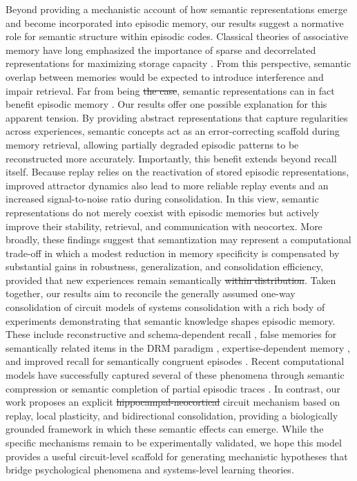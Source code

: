 \documentclass{article}
\providecommand{\DIFaddtex}[1]{{\protect\color{blue}\uwave{#1}}} %
\providecommand{\DIFdeltex}[1]{{\protect\color{red}\sout{#1}}}                      %
\providecommand{\DIFaddbegin}{} %
\providecommand{\DIFaddend}{} %
\providecommand{\DIFdelbegin}{} %
\providecommand{\DIFdelend}{} %
\providecommand{\DIFadd}[1]{\texorpdfstring{\DIFaddtex{#1}}{#1}} %
\providecommand{\DIFdel}[1]{\texorpdfstring{\DIFdeltex{#1}}{}} %
\begin{document}
\newline\newline
Beyond providing a mechanistic account of how semantic representations emerge and become incorporated into episodic memory, our results suggest a normative role for semantic structure within episodic codes. Classical theories of associative memory have long emphasized the importance of sparse and decorrelated representations for maximizing storage capacity . From this perspective, semantic overlap between memories would be expected to introduce interference and impair retrieval. Far from being \DIFdelbegin \DIFdel{the case}\DIFdelend \DIFaddbegin \DIFadd{detrimental}\DIFaddend , semantic representations can in fact benefit episodic memory . Our results offer one possible explanation for this apparent tension. By providing abstract representations that capture regularities across experiences, semantic concepts act as an error-correcting scaffold during memory retrieval, allowing partially degraded episodic patterns to be reconstructed more accurately. Importantly, this benefit extends beyond recall itself. Because replay relies on the reactivation of stored episodic representations, improved attractor dynamics also lead to more reliable replay events and an increased signal-to-noise ratio during consolidation. In this view, semantic representations do not merely coexist with episodic memories but actively improve their stability, retrieval, and communication with neocortex. More broadly, these findings suggest that semantization may represent a computational trade-off in which a modest reduction in memory specificity is compensated by substantial gains in robustness, generalization, and consolidation efficiency, provided that new experiences remain semantically \DIFdelbegin \DIFdel{within distribution}\DIFdelend \DIFaddbegin \DIFadd{in-distribution}\DIFaddend .
\newline\newline
Taken together, our results aim to reconcile the generally assumed one-way consolidation of circuit models of systems consolidation  with a rich body of experiments demonstrating that semantic knowledge shapes episodic memory. These include reconstructive and schema-dependent recall , false memories for semantically related items in the DRM paradigm , expertise-dependent memory , and improved recall for semantically congruent episodes . Recent computational models have successfully captured several of these phenomena through semantic compression  or semantic completion of partial episodic traces . In contrast, our work proposes an explicit \DIFdelbegin \DIFdel{hippocampal-neocortical }\DIFdelend circuit mechanism based on replay, local plasticity, and bidirectional consolidation, providing a biologically grounded framework in which these semantic effects can emerge. While the specific mechanisms remain to be experimentally validated, we hope this model provides a useful circuit-level scaffold for generating mechanistic hypotheses that bridge psychological phenomena and systems-level learning theories.
\end{document}
